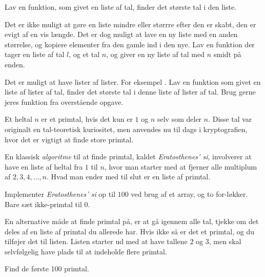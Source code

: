 	\begin{exercise}
		Lav en funktion, som givet en liste af tal, finder det største tal i den
		liste.
	\end{exercise}

    \begin{exercise}
        Det er ikke muligt at gøre en liste mindre eller størrre efter
        den er skabt, den er evigt af en vis længde.  Det er dog
        muligt at lave en ny liste med en anden størrelse, og kopiere
        elementer fra den gamle ind i den nye.
        Lav en funktion  der tager en liste af tal
        \(l\), og et tal \(n\), og giver en ny liste af tal med \(n\)
        smidt på enden.
    \end{exercise}

    \begin{exercise}
        Det er muligt at have lister af lister. For eksempel
        .  Lav en funktion som givet en liste af
        lister af tal, finder det største tal i denne liste af lister
        af tal. Brug gerne jeres funktion fra overstående opgave.
    \end{exercise}

	\begin{exercise}
		Et heltal \(n\) er et primtal, hvis det kun er \(1\) og \(n\) selv som
		deler \(n\). Disse tal var originalt en tal-teoretisk kuriositet, men
		anvendes nu til dags i kryptografien, hvor det er vigtigt at finde store
		primtal.

		En klassisk \emph{algoritme} til at finde primtal, kaldet
		\emph{Eratosthenes' si}, involverer at have en liste af heltal fra \(1\)
		til \(n\), hvor man starter med at fjerner alle multiplum af
		\(2, 3, 4, \dots, n\). Hvad man ender med til slut er en liste af primtal.

		Implementer \emph{Eratosthenes' si} op til \(100\) ved brug af et
		array, og to for-løkker. Bare sæt ikke-primtal til \(0\).
	\end{exercise}

    \begin{exercise}
        En alternative måde at finde primtal på, er at gå igennem alle
        tal, tjekke om det deles af en liste af primtal du allerede
        har. Hvis ikke så er det et primtal, og du tilføjer det til
        listen. Listen starter ud med at have tallene \(2\) og \(3\),
        men skal selvfølgelig have plads til at indeholde flere
        primtal.

        Find de første 100 primtal.
    \end{exercise}

